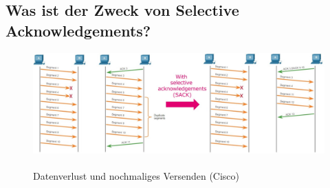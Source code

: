 \subsection*{Was ist der Zweck von \flqq{}Selective Acknowledgements\frqq?}
\begin{figure}[H]
    \begin{center}
    \label{pic:SelectiveAcknowledgement}
    \includegraphics[width=\textwidth]{images/Selective_Acknowledgement.jpg}
    \caption{Datenverlust und nochmaliges Versenden (\textsuperscript{\textcopyright}Cisco)}
    \end{center}
\end{figure}